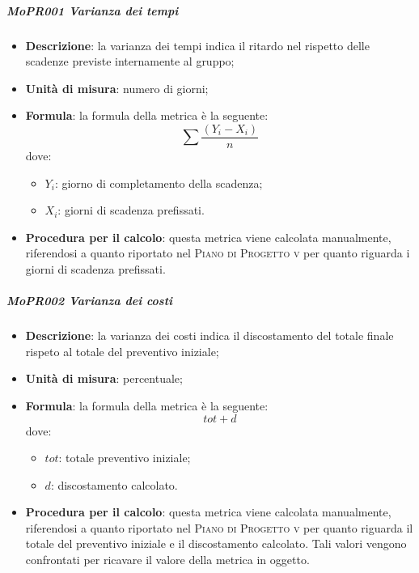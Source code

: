 \subparagraph{MoPR001 Varianza dei tempi}
\begin{itemize}
  \item \textbf{Descrizione}: la varianza dei tempi indica il ritardo nel rispetto delle scadenze previste internamente al gruppo;
  \item \textbf{Unità di misura}: numero di giorni;
  \item \textbf{Formula}: la formula della metrica è la seguente:
    \begin{displaymath}
    \sum \frac{(Y_i - X_i)}{n}
    \end{displaymath}
    dove:
    \begin{itemize}
      \item $ Y_i $: giorno di completamento della scadenza;
      \item $ X_i $: giorni di scadenza prefissati.
    \end{itemize}
    \item \textbf{Procedura per il calcolo}: questa metrica viene calcolata manualmente, riferendosi a quanto riportato nel \textsc{Piano di Progetto v} per quanto riguarda i giorni di scadenza prefissati.
\end{itemize}

\subparagraph{MoPR002 Varianza dei costi}
\begin{itemize}
  \item \textbf{Descrizione}: la varianza dei costi indica il discostamento del totale finale rispeto al totale del preventivo iniziale;
  \item \textbf{Unità di misura}: percentuale;
  \item \textbf{Formula}: la formula della metrica è la seguente:
  \begin{displaymath}
    tot + d
  \end{displaymath}
  dove:
  \begin{itemize}
    \item $ tot $: totale preventivo iniziale;
    \item $ d $: discostamento calcolato.
  \end{itemize}
  \item \textbf{Procedura per il calcolo}: questa metrica viene calcolata manualmente, riferendosi a quanto riportato nel \textsc{Piano di Progetto v} per quanto riguarda il totale del preventivo iniziale e il discostamento calcolato. Tali valori vengono confrontati per ricavare il valore della metrica in oggetto.
\end{itemize}

